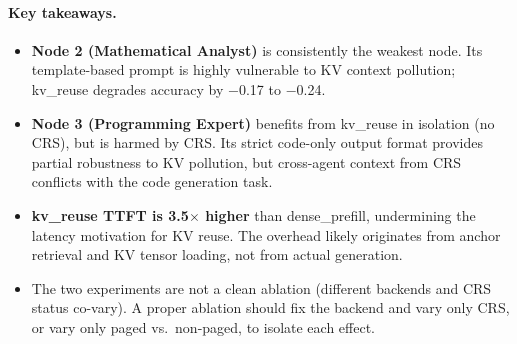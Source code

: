 \documentclass[11pt]{article}
\begin{document}
\paragraph{Key takeaways.}
\begin{itemize}
  \item \textbf{Node 2 (Mathematical Analyst)} is consistently the weakest
        node.  Its template-based prompt is highly vulnerable to KV context
        pollution; kv\_reuse degrades accuracy by $-$0.17 to $-$0.24.
  \item \textbf{Node 3 (Programming Expert)} benefits from kv\_reuse in
        isolation (no CRS), but is harmed by CRS.  Its strict code-only output
        format provides partial robustness to KV pollution, but cross-agent
        context from CRS conflicts with the code generation task.
  \item \textbf{kv\_reuse TTFT is 3.5$\times$ higher} than dense\_prefill,
        undermining the latency motivation for KV reuse.  The overhead likely
        originates from anchor retrieval and KV tensor loading, not from
        actual generation.
  \item The two experiments are not a clean ablation (different backends and
        CRS status co-vary).  A proper ablation should fix the backend and vary
        only CRS, or vary only paged vs.\ non-paged, to isolate each effect.
\end{itemize}
\end{document}
